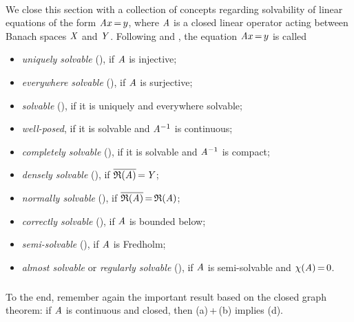 \documentclass[11pt,twoside]{article}
\begin{document}
\paragraph*{} %
We close this section with a collection of concepts regarding solvability
of linear equations of the form $\mathit{A} x {\,=\,} y$,
where $\mathit{A}$ is a closed linear operator acting between Banach spaces
$\mathit{X}$ and $\mathit{Y}$.
Following \cite{Kr} and \cite{Br2},
the equation $\mathit{A} x {\,=\,} y$ is called

\begin{itemize}[leftmargin=15pt]
\item[(a)]
\textit{uniquely solvable} (\cite{Kr}),
if $\mathit{A}$ is injective;

\item[(b)]
\textit{everywhere solvable} (\cite{Kr}),
if $\mathit{A}$ is surjective;

\item[(c)]
\textit{solvable} (\cite{Br2}),
if it is uniquely and everywhere solvable;

\item[(d)]
\textit{well-posed},
if it is solvable and $\mathit{A}^{-1}$ is continuous;

\item[(e)]
\textit{completely solvable} (\cite{Br2}),
if it is solvable and $\mathit{A}^{-1}$ is compact;

\item[(f)]
\textit{densely solvable} (\cite{Kr}),
if $\overline{\mathfrak{R}(\mathit{A})} {\,=\,} \mathit{Y}$;

\item[(g)]
\textit{normally solvable} (\cite{Kr}),
if $\overline{\mathfrak{R}(\mathit{A})} {\,=\,} \mathfrak{R}(\mathit{A})$;

\item[(h)]
\textit{correctly solvable} (\cite{Kr}),
if $\mathit{A}$ is bounded below;

\item[(i)]
\textit{semi-solvable} (\cite{Br2}), if $\mathit{A}$ is Fredholm;

\item[(j)]
\textit{almost solvable} or \textit{regularly solvable} (\cite{Br2}),
if $\mathit{A}$ is semi-solvable and $\chi(\mathit{A}) {\,=\,} 0$.
\end{itemize}

\subparagraph*{}
To the end,
remember again the important result based on the closed graph theorem:
if $\mathit{A}$ is continuous and closed,
then (a)\,+\,(b) implies (d).
\end{document}
